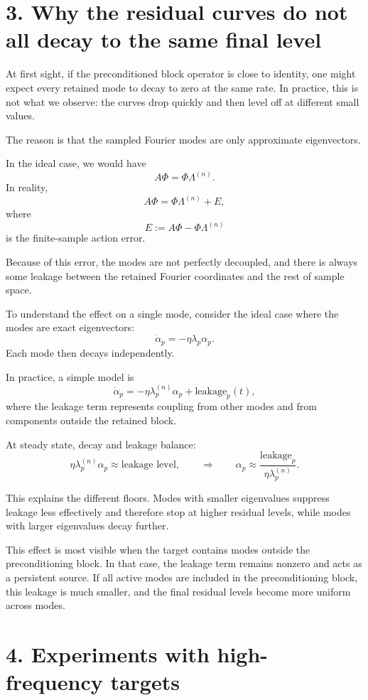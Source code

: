 \documentclass[11pt]{article}
\begin{document}
\section*{3. Why the residual curves do not all decay to the same final level}

At first sight, if the preconditioned block operator is close to identity, one might expect every retained mode to decay to zero at the same rate. In practice, this is not what we observe: the curves drop quickly and then level off at different small values.

The reason is that the sampled Fourier modes are only approximate eigenvectors.

In the ideal case, we would have
\[
	A\Phi=\Phi\Lambda^{(n)}.
\]
In reality,
\[
	A\Phi=\Phi\Lambda^{(n)}+E,
\]
where
\[
	E:=A\Phi-\Phi\Lambda^{(n)}
\]
is the finite-sample action error.

Because of this error, the modes are not perfectly decoupled, and there is always some leakage between the retained Fourier coordinates and the rest of sample space.

To understand the effect on a single mode, consider the ideal case where the modes are exact eigenvectors:
\[
	\dot \alpha_p = -\eta \lambda_p \alpha_p.
\]
Each mode then decays independently.

In practice, a simple model is
\[
	\dot \alpha_p = -\eta \lambda_p^{(n)} \alpha_p + \text{leakage}_p(t),
\]
where the leakage term represents coupling from other modes and from components outside the retained block.

At steady state, decay and leakage balance:
\[
	\eta \lambda_p^{(n)} \alpha_p \approx \text{leakage level},
	\qquad
	\Rightarrow
	\qquad
	\alpha_p \approx \frac{\text{leakage}_p}{\eta \lambda_p^{(n)}}.
\]

This explains the different floors. Modes with smaller eigenvalues suppress leakage less effectively and therefore stop at higher residual levels, while modes with larger eigenvalues decay further.

This effect is most visible when the target contains modes outside the preconditioning block. In that case, the leakage term remains nonzero and acts as a persistent source. If all active modes are included in the preconditioning block, this leakage is much smaller, and the final residual levels become more uniform across modes.

\section*{4. Experiments with high-frequency targets}
\end{document}
